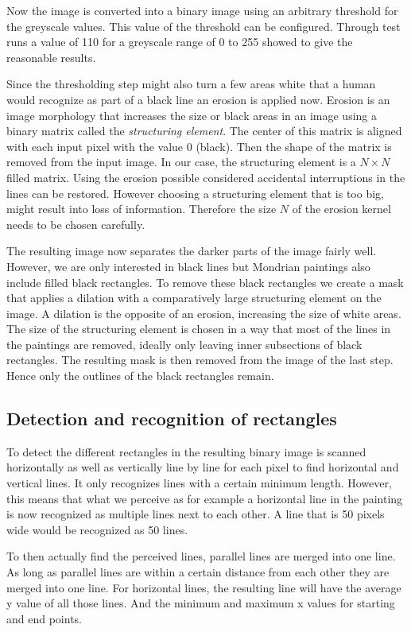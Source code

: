 Now the image is converted into a binary image using an arbitrary threshold for
the greyscale values. This value of the threshold can be configured. Through
test runs a value of 110 for a greyscale range of 0 to 255 showed to give the
reasonable results.

Since the thresholding step might also turn a few areas white that a human would
recognize as part of a black line an erosion is applied now. Erosion is an image
morphology that increases the size or black areas in an image using a binary
matrix called the \textit{structuring element}. The center of this matrix is
aligned with each input pixel with the value 0 (black). Then the shape of the
matrix is removed from the input image. In our case, the structuring element is
a $N\times N$ filled matrix. Using the erosion possible considered accidental
interruptions in the lines can be restored. However choosing a structuring
element that is too big, might result into loss of information. Therefore the
size $N$ of the erosion kernel needs to be chosen carefully.

The resulting image now separates the darker parts of the image fairly well.
However, we are only interested in black lines but Mondrian paintings also
include filled black rectangles. To remove these black rectangles we create a
mask that applies a dilation with a comparatively large structuring element on
the image. A dilation is the opposite of an erosion, increasing the size of
white areas. The size of the structuring element is chosen in a way that most of
the lines in the paintings are removed, ideally only leaving inner subsections
of black rectangles. The resulting mask is then removed from the image of the
last step. Hence only the outlines of the black rectangles remain.

\subsection{Detection and recognition of rectangles}

To detect the different rectangles in the resulting binary image is scanned
horizontally as well as vertically line by line for each pixel to find
horizontal and vertical lines. It only recognizes lines with a certain minimum
length. However, this means that what we perceive as for example a horizontal
line in the painting is now recognized as multiple lines next to each other. A
line that is 50 pixels wide would be recognized as 50 lines.

To then actually find the perceived lines, parallel lines are merged into one
line. As long as parallel lines are within a certain distance from each other
they are merged into one line. For horizontal lines, the resulting line will
have the average y value of all those lines. And the minimum and maximum x
values for starting and end points.

